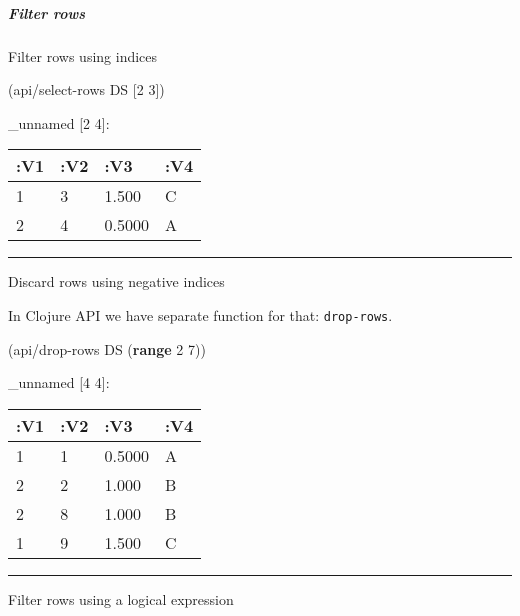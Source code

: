 \documentclass[]{article}
\newenvironment{Shaded}{\begin{snugshade}}{\end{snugshade}}
\newcommand{\KeywordTok}[1]{\textcolor[rgb]{0.13,0.29,0.53}{\textbf{#1}}}
\newcommand{\DecValTok}[1]{\textcolor[rgb]{0.00,0.00,0.81}{#1}}
\newcommand{\VariableTok}[1]{\textcolor[rgb]{0.00,0.00,0.00}{#1}}
\newcommand{\AttributeTok}[1]{\textcolor[rgb]{0.77,0.63,0.00}{#1}}
\newcommand{\NormalTok}[1]{#1}
\let\oldsubparagraph\subparagraph
\renewcommand{\subparagraph}[1]{\oldsubparagraph{#1}\mbox{}}
\begin{document}
\subparagraph{Filter rows}\label{filter-rows}

Filter rows using indices

\begin{Shaded}
\begin{Highlighting}[]
\NormalTok{(api/select-rows DS [}\DecValTok{2} \DecValTok{3}\NormalTok{])}
\end{Highlighting}
\end{Shaded}

\_unnamed {[}2 4{]}:

\begin{longtable}[]{@{}llll@{}}
\toprule
:V1 & :V2 & :V3 & :V4\tabularnewline
\midrule
\endhead
1 & 3 & 1.500 & C\tabularnewline
2 & 4 & 0.5000 & A\tabularnewline
\bottomrule
\end{longtable}

\begin{center}\rule{0.5\linewidth}{0.5pt}\end{center}

Discard rows using negative indices

In Clojure API we have separate function for that: \texttt{drop-rows}.

\begin{Shaded}
\begin{Highlighting}[]
\NormalTok{(api/drop-rows DS (}\KeywordTok{range} \DecValTok{2} \DecValTok{7}\NormalTok{))}
\end{Highlighting}
\end{Shaded}

\_unnamed {[}4 4{]}:

\begin{longtable}[]{@{}llll@{}}
\toprule
:V1 & :V2 & :V3 & :V4\tabularnewline
\midrule
\endhead
1 & 1 & 0.5000 & A\tabularnewline
2 & 2 & 1.000 & B\tabularnewline
2 & 8 & 1.000 & B\tabularnewline
1 & 9 & 1.500 & C\tabularnewline
\bottomrule
\end{longtable}

\begin{center}\rule{0.5\linewidth}{0.5pt}\end{center}

Filter rows using a logical expression

\begin{Shaded}
\end{Shaded}
\end{document}
